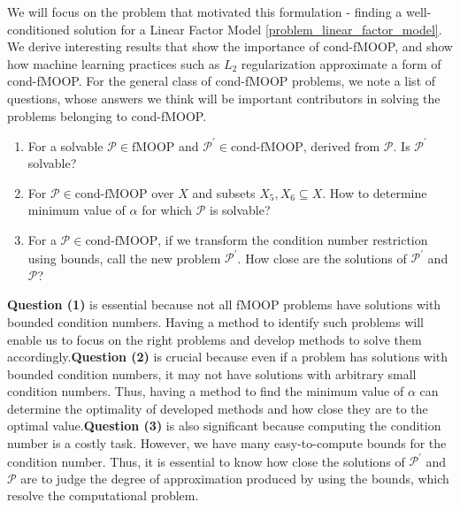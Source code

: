 We will focus on the problem that motivated this formulation - finding a well-conditioned solution for a Linear Factor Model \ref{problem_linear_factor_model}. \newline We derive interesting results that show the importance of cond-fMOOP, and show how machine learning practices such as $L_2$ regularization approximate a form of cond-fMOOP. \newline For the general class of cond-fMOOP problems, we note a list of questions, whose answers we think will be important contributors in solving the problems belonging to cond-fMOOP.
\begin{enumerate} \label{important_questions}
\setlength\itemsep{-1pt}
    \item For a solvable $\mathcal{P} \in \text{fMOOP}$ and $\mathcal{P}^{'} \in \text{cond-fMOOP, derived from } \mathcal{P}$. Is $\mathcal{P}^{'}$ solvable?
    \item For $\mathcal{P} \in \text{cond-fMOOP}$ over $X$ and subsets $X_5,X_6 \subseteq X$. How to determine minimum value of $\alpha$ for which $\mathcal{P}$ is solvable?
    \item For a $\mathcal{P} \in \text{cond-fMOOP}$, if we transform the condition number restriction using bounds, call the new problem $\mathcal{P}^{'}$. How close are the solutions of $\mathcal{P}^{'}$ and $\mathcal{P}$? \label{question_transformed_problems_behaviour}
\end{enumerate} \textbf{Question (1)} is essential because not all fMOOP problems have solutions with bounded condition numbers. Having a method to identify such problems will enable us to focus on the right problems and develop methods to solve them accordingly.\newline \textbf{Question (2)} is crucial because even if a problem has solutions with bounded condition numbers, it may not have solutions with arbitrary small condition numbers. Thus, having a method to find the minimum value of $\alpha$ can determine the optimality of developed methods and how close they are to the optimal value.\newline \textbf{Question (3)} is also significant because computing the condition number is a costly task. However, we have many easy-to-compute bounds for the condition number. Thus, it is essential to know how close the solutions of $\mathcal{P}^{'}$ and $\mathcal{P}$ are to judge the degree of approximation produced by using the bounds, which resolve the computational problem.
\newpage 
{}
